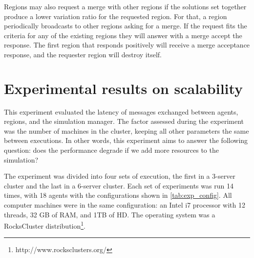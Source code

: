\documentclass[preprint,12pt]{elsarticle}
\begin{document}
Regions may also request a merge with other regions if the solutions set together produce a lower variation ratio for the requested region. For that, a region periodically broadcasts to other regions asking for a merge. If the request fits the criteria for any of the existing regions they will answer with a merge accept the response. The first region that responds positively will receive a merge acceptance response, and the requester region will destroy itself. 

\section{Experimental results on scalability}
\label{sec:experiment}
This experiment evaluated the latency of messages exchanged between agents, regions, and the simulation manager. The factor assessed during the experiment was the number of machines in the cluster, keeping all other parameters the same between executions. In other words, this experiment aims to answer the following question: does the performance degrade if we add more resources to the simulation?

The experiment was divided into four sets of execution, the first in a 3-server cluster and the last in a 6-server cluster. Each set of experiments was run 14 times, with 18 agents with the configurations shown in \autoref{tab:exp_config}. All computer machines were in the same configuration: an Intel i7 processor with 12 threads, 32 GB of RAM, and 1TB of HD. The operating system was a RocksCluster distribution\footnote{http://www.rocksclusters.org/}. 
\end{document}

